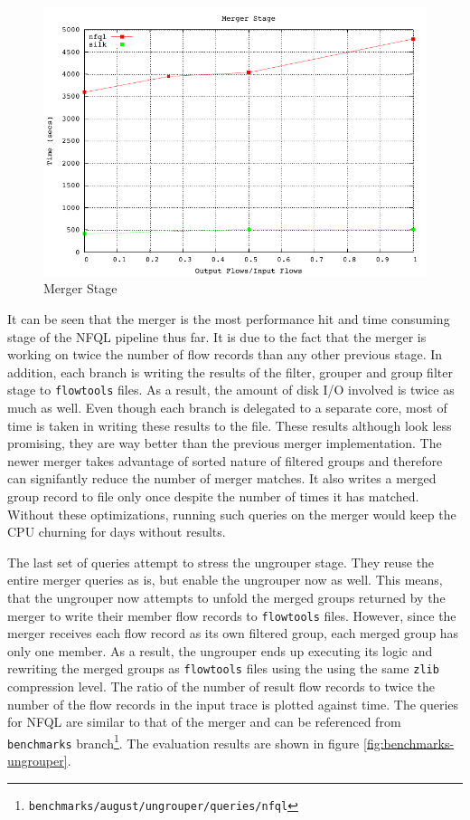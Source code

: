 \begin{figure}[h!]
  \begin{center}
    \includegraphics* [width=0.8\linewidth]{figures/benchmarks/merger}
    \caption{Merger Stage}
    \label{fig:benchmarks-merger}
  \end{center}
\end{figure}

It can be seen that the merger is the most performance hit and time consuming
stage of the \ac{NFQL} pipeline thus far. It is due to the fact that the
merger is working on twice the number of flow records than any other previous
stage. In addition, each branch is writing the results of the filter, grouper
and group filter stage to \texttt{flowtools} files. As a result, the amount of
disk I/O involved is twice as much as well. Even  though each branch is delegated to a separate core, most
of time is taken in writing these results to the file. These results
although look less promising, they are way better than the previous merger
implementation. The newer merger takes advantage of sorted nature of
filtered groups and therefore can signifantly reduce the number of merger
matches. It also writes a merged group record to file only once despite the
number of times it has matched. Without these optimizations, running such
queries on the merger would keep the CPU churning for days without results.


The last set of queries attempt to stress the ungrouper stage. They reuse the
entire merger queries as is, but enable the ungrouper now as well. This means,
that the ungrouper now attempts to unfold the merged groups returned by the
merger to write their member flow records to \texttt{flowtools} files.
However, since the merger receives each flow record as its
 own filtered group, each merged group has
only one member. As a result, the ungrouper ends up executing its logic and
rewriting the merged groups as \texttt{flowtools} files using the using the
same \texttt{zlib} compression level. The ratio of the number of result flow
records to twice the number of the flow records in the input trace is plotted
against time. The queries for \ac{NFQL} are similar to that of the merger and
can be referenced from \texttt{benchmarks}
branch\footnote{\texttt{benchmarks/august/ungrouper/queries/nfql}}.  The
evaluation results are shown in figure \ref{fig:benchmarks-ungrouper}.

